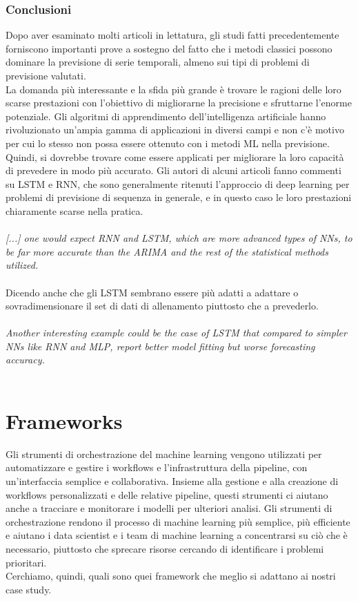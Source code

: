\documentclass[12pt,a4paper]{report}
\begin{document}
\subsection{Conclusioni}
Dopo aver esaminato molti articoli in lettatura, gli studi fatti precedentemente forniscono importanti prove a sostegno del fatto che i metodi classici possono dominare la previsione di serie temporali, almeno sui tipi di problemi di previsione valutati.\\
La domanda più interessante e la sfida più grande è trovare le ragioni delle loro scarse prestazioni con l'obiettivo di migliorarne la precisione e sfruttarne l'enorme potenziale. Gli algoritmi di apprendimento dell'intelligenza artificiale hanno rivoluzionato un'ampia gamma di applicazioni in diversi campi e non c'è motivo per cui lo stesso non possa essere ottenuto con i metodi ML nella previsione. Quindi, si dovrebbe trovare come essere applicati per migliorare la loro capacità di prevedere in modo più accurato.
Gli autori di alcuni articoli fanno commenti su LSTM e RNN, che sono generalmente ritenuti l'approccio di deep learning per problemi di previsione di sequenza in generale, e in questo caso le loro prestazioni chiaramente scarse nella pratica.\\
\\
\emph{[...] one would expect RNN and LSTM, which are more advanced types of NNs, to be far more accurate than the ARIMA and the rest of the statistical methods utilized.} \cite{makridakis2018statistical}\\
\\
Dicendo anche che gli LSTM sembrano essere più adatti a adattare o sovradimensionare il set di dati di allenamento piuttosto che a prevederlo.\\
\\
\emph{Another interesting example could be the case of LSTM that compared to simpler NNs like RNN and MLP, report better model fitting but worse forecasting accuracy.} \cite{makridakis2018statistical}\\
\\



\chapter{Frameworks}
Gli strumenti di orchestrazione del machine learning vengono utilizzati per automatizzare e gestire i workflows e l'infrastruttura della pipeline, con un'interfaccia semplice e collaborativa. Insieme alla gestione e alla creazione di workflows personalizzati e delle relative pipeline, questi strumenti ci aiutano anche a tracciare e monitorare i modelli per ulteriori analisi.
Gli strumenti di orchestrazione rendono il processo di machine learning più semplice, più efficiente e aiutano i data scientist e i team di machine learning a concentrarsi su ciò che è necessario, piuttosto che sprecare risorse cercando di identificare i problemi prioritari.\\
Cerchiamo, quindi, quali sono quei framework che meglio si adattano ai nostri case study.
\end{document}
